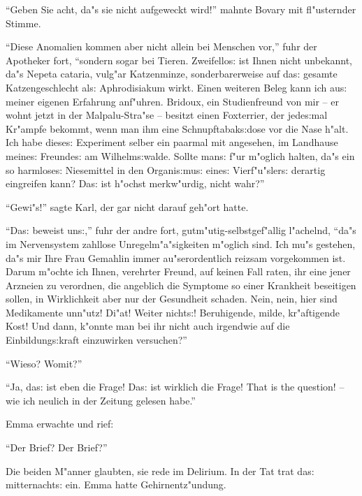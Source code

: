 \documentclass[oneside,12pt]{book}
\newenvironment{antiqua}{\normalfont}{}%
\newcommand{\s}{s:}%
\begin{document}
"`Geben Sie acht, da"s sie nicht aufgeweckt wird!"' mahnte Bovary
mit fl"usternder Stimme.

"`Diese Anomalien kommen aber nicht allein bei Menschen vor,"'
fuhr der Apotheker fort, "`sondern sogar bei Tieren. Zweifello{\s}
ist Ihnen nicht unbekannt, da"s \begin{antiqua}Nepeta
cataria\end{antiqua}, vulg"ar Katzenminze, sonderbarerweise auf
da{\s} gesamte Katzengeschlecht al{\s} Aphrodisiakum wirkt. Einen
weiteren Beleg kann ich au{\s} meiner eigenen Erfahrung anf"uhren.
Bridoux, ein Studienfreund von mir -- er wohnt jetzt in der
Malpalu-Stra"se -- besitzt einen Foxterrier, der jede{\s}mal
Kr"ampfe bekommt, wenn man ihm eine Schnupftabak{\s}dose vor die
Nase h"alt. Ich habe diese{\s} Experiment selber ein paarmal mit
angesehen, im Landhause meine{\s} Freunde{\s} am Wilhelm{\s}walde.
Sollte man{\s} f"ur m"oglich halten, da"s ein so harmlose{\s}
Niesemittel in den Organi{\s}mu{\s} eine{\s} Vierf"u"sler{\s}
derartig eingreifen kann? Da{\s} ist h"ochst merkw"urdig, nicht
wahr?"'

"`Gewi"s!"' sagte Karl, der gar nicht darauf geh"ort hatte.

"`Da{\s} beweist un{\s},"' fuhr der andre fort,
gutm"utig-selbstgef"allig l"achelnd, "`da"s im Nervensystem
zahllose Unregelm"a"sigkeiten m"oglich sind. Ich mu"s gestehen,
da"s mir Ihre Frau Gemahlin immer au"serordentlich reizsam
vorgekommen ist. Darum m"ochte ich Ihnen, verehrter Freund, auf
keinen Fall raten, ihr eine jener Arzneien zu verordnen, die
angeblich die Symptome so einer Krankheit beseitigen sollen, in
Wirklichkeit aber nur der Gesundheit schaden. Nein, nein, hier
sind Medikamente unn"utz! Di"at! Weiter nicht{\s}! Beruhigende,
milde, kr"aftigende Kost! Und dann, k"onnte man bei ihr nicht auch
irgendwie auf die Einbildung{\s}kraft einzuwirken versuchen?"'

"`Wieso? Womit?"'

"`Ja, da{\s} ist eben die Frage! Da{\s} ist wirklich die Frage!
\begin{antiqua}That is the question\end{antiqua}! -- wie ich
neulich in der Zeitung gelesen habe."'

Emma erwachte und rief:

"`Der Brief? Der Brief?"'

Die beiden M"anner glaubten, sie rede im Delirium. In der Tat trat
da{\s} mitternacht{\s} ein. Emma hatte Gehirnent\/z"undung.
\end{document}
